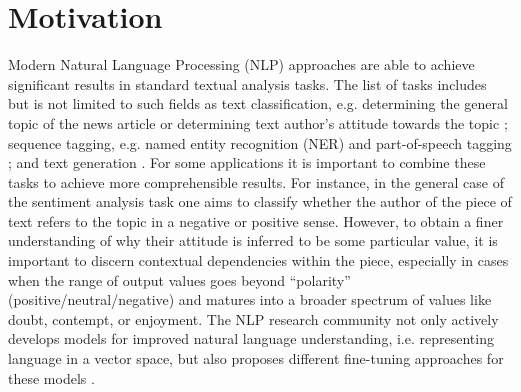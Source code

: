 
\section{Motivation}\label{sec:motication}

Modern Natural Language Processing (NLP) approaches are able to achieve significant results in standard textual analysis tasks. 
The list of tasks includes but is not limited to such fields as text classification, e.g. determining the general topic of the news article \cite{text-classification-Altinel2018} or determining text author's attitude towards the topic \cite{sentiment-analysis-Medhat2014}; sequence tagging,  e.g. named entity recognition (NER)  \cite{ner-Strakova2019,ner-Zhanming2019,ner-Yamada2020,ner-Luoma2020} and part-of-speech tagging \cite{pos-tagging-Bohnet2018}; and text generation \cite{text-gen-Guo2017}. For some applications it is important to combine these tasks to achieve more comprehensible results. 
For instance, in the general case of the sentiment analysis task one aims to classify  whether the author of the piece of text refers to the topic in a negative or positive sense. However, to obtain a finer understanding of why their attitude is inferred to be some particular value, it is important to discern contextual dependencies within the piece, especially in cases when the range of output values goes beyond “polarity” (positive/neutral/negative) and matures into a broader spectrum of values like doubt, contempt, or enjoyment. 
The NLP research community not only actively develops models for improved natural language understanding, i.e. representing language in a vector space, \cite{gpt-Radford2018,bert-Devlin2019,xlnet-Yang2020} but also proposes different fine-tuning approaches for these models \cite{robarta-Liu2019,cr-Joshi2019,gpt2-Radford2019,gpt3-Brown2020}. 

